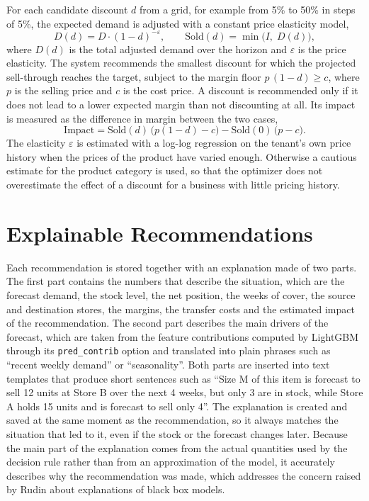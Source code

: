 \documentclass{StockSense}
\begin{document}
For each candidate discount $d$ from a grid, for example from 5\% to 50\% in steps of 5\%, the expected demand is adjusted with a constant price elasticity model,
\begin{equation}
    D(d) = D \cdot (1 - d)^{-\varepsilon}, \qquad
    \text{Sold}(d) = \min\big(I,\; D(d)\big),
\end{equation}
where $D(d)$ is the total adjusted demand over the horizon and $\varepsilon$ is the price elasticity. The system recommends the smallest discount for which the projected sell-through reaches the target, subject to the margin floor $p\,(1-d) \ge c$, where $p$ is the selling price and $c$ is the cost price. A discount is recommended only if it does not lead to a lower expected margin than not discounting at all. Its impact is measured as the difference in margin between the two cases,
\begin{equation}
    \text{Impact} = \text{Sold}(d)\,\big(p(1-d) - c\big) - \text{Sold}(0)\,\big(p - c\big).
\end{equation}
The elasticity $\varepsilon$ is estimated with a log-log regression on the tenant's own price history when the prices of the product have varied enough. Otherwise a cautious estimate for the product category is used, so that the optimizer does not overestimate the effect of a discount for a business with little pricing history.

\section{Explainable Recommendations}
\label{sec:explain}

Each recommendation is stored together with an explanation made of two parts. The first part contains the numbers that describe the situation, which are the forecast demand, the stock level, the net position, the weeks of cover, the source and destination stores, the margins, the transfer costs and the estimated impact of the recommendation. The second part describes the main drivers of the forecast, which are taken from the feature contributions computed by LightGBM through its \texttt{pred\_contrib} option and translated into plain phrases such as ``recent weekly demand'' or ``seasonality''. Both parts are inserted into text templates that produce short sentences such as ``Size M of this item is forecast to sell 12 units at Store B over the next 4 weeks, but only 3 are in stock, while Store A holds 15 units and is forecast to sell only 4''. The explanation is created and saved at the same moment as the recommendation, so it always matches the situation that led to it, even if the stock or the forecast changes later. Because the main part of the explanation comes from the actual quantities used by the decision rule rather than from an approximation of the model, it accurately describes why the recommendation was made, which addresses the concern raised by Rudin about explanations of black box models.
\end{document}
